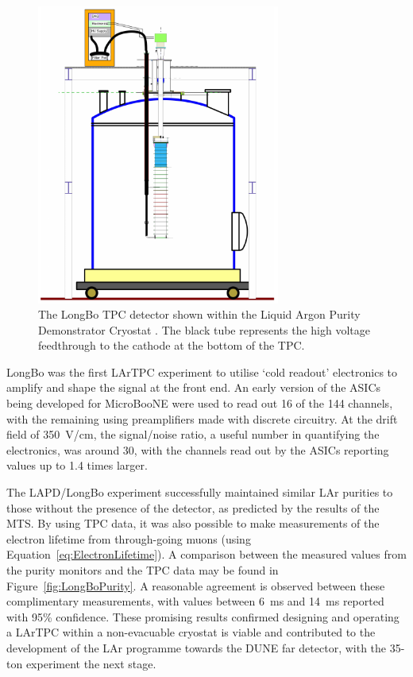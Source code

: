\begin{figure}
  \centering
  \includegraphics[width=8cm]{LongBo.pdf}
  \caption[The LongBo TPC detector shown within the Liquid Argon Purity Demonstrator Cryostat.]{The LongBo TPC detector shown within the Liquid Argon Purity Demonstrator Cryostat \cite{LongBo2015}.  The black tube represents the high voltage feedthrough to the cathode at the bottom of the TPC.}
  \label{fig:LongBo}
\end{figure}

LongBo was the first LArTPC experiment to utilise `cold readout' electronics to amplify and shape the signal at the front end.  An early version of the ASICs being developed for MicroBooNE were used to read out 16 of the 144 channels, with the remaining using preamplifiers made with discrete circuitry.  At the drift field of 350~V/cm, the signal/noise ratio, a useful number in quantifying the electronics, was around 30, with the channels read out by the ASICs reporting values up to 1.4 times larger.

The LAPD/LongBo experiment successfully maintained similar LAr purities to those without the presence of the detector, as predicted by the results of the MTS.  By using TPC data, it was also possible to make measurements of the electron lifetime from through-going muons (using Equation~\ref{eq:ElectronLifetime}).  A comparison between the measured values from the purity monitors and the TPC data may be found in Figure~\ref{fig:LongBoPurity}.  A reasonable agreement is observed between these complimentary measurements, with values between 6~ms and 14~ms reported with 95\% confidence.  These promising results confirmed designing and operating a LArTPC within a non-evacuable cryostat is viable and contributed to the development of the LAr programme towards the DUNE far detector, with the 35-ton experiment the next stage.

